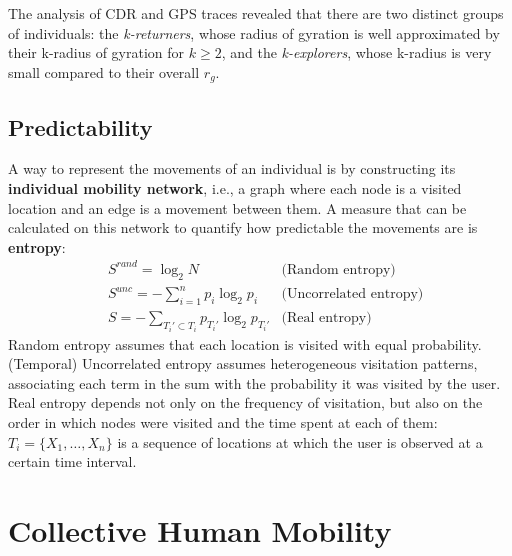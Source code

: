 The analysis of CDR and GPS traces revealed that there are two distinct groups of individuals: the \textit{k-returners}, whose radius of gyration is well approximated by their k-radius of gyration for $k \geq 2$, and the \textit{k-explorers}, whose k-radius is very small compared to their overall $r_g$.

\subsection{Predictability}
A way to represent the movements of an individual is by constructing its \textbf{individual mobility network}, i.e., a graph where each node is a visited location and an edge is a movement between them. A measure that can be calculated on this network to quantify how predictable the movements are is \textbf{entropy}:
\begin{align*}
    &S^{\textit{rand}} = \log_2 N &\text{(Random entropy)} \\
    &S^{\textit{unc}} = - \sum_{i=1}^n p_i \log_2 p_i &\text{(Uncorrelated entropy)} \\
    &S = -\sum_{T_i' \subset T_i} p_{T_i'} \log_2 p_{T_i'} &\text{(Real entropy)}
\end{align*}
Random entropy assumes that each location is visited with equal probability. (Temporal) Uncorrelated entropy assumes heterogeneous visitation patterns, associating each term in the sum with the probability it was visited by the user. Real entropy depends not only on the frequency of visitation, but also on the order in which nodes were visited and the time spent at each of them: $T_i = \{X_1, \dots, X_n\}$ is a sequence of locations at which the user is observed at a certain time interval.


\section{Collective Human Mobility}

